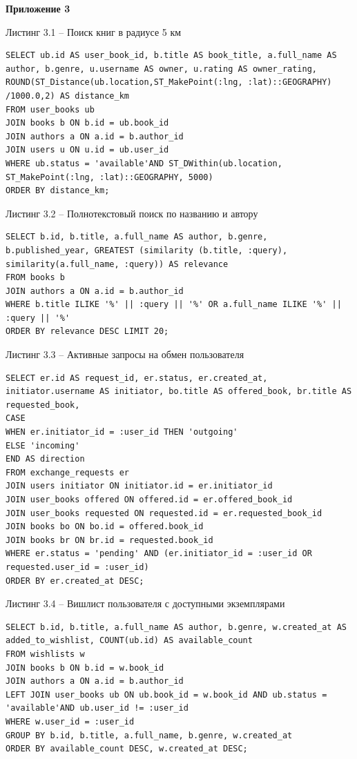 \documentclass[14pt,a4paper]{extarticle}
\begin{document}
\textbf{Приложение 3}

\begin{center}
Листинг 3.1 -- Поиск книг в радиусе 5 км
\end{center}
\begin{lstlisting}
SELECT ub.id AS user_book_id, b.title AS book_title, a.full_name AS author, b.genre, u.username AS owner, u.rating AS owner_rating, ROUND(ST_Distance(ub.location,ST_MakePoint(:lng, :lat)::GEOGRAPHY) /1000.0,2) AS distance_km
FROM user_books ub
JOIN books b ON b.id = ub.book_id
JOIN authors a ON a.id = b.author_id
JOIN users u ON u.id = ub.user_id
WHERE ub.status = 'available'AND ST_DWithin(ub.location, ST_MakePoint(:lng, :lat)::GEOGRAPHY, 5000)
ORDER BY distance_km;
\end{lstlisting}

\newpage
\begin{center}
Листинг 3.2 -- Полнотекстовый поиск по названию и автору
\end{center}
\begin{lstlisting}
SELECT b.id, b.title, a.full_name AS author, b.genre, b.published_year, GREATEST (similarity (b.title, :query), similarity(a.full_name, :query)) AS relevance
FROM books b
JOIN authors a ON a.id = b.author_id
WHERE b.title ILIKE '%' || :query || '%' OR a.full_name ILIKE '%' || :query || '%'
ORDER BY relevance DESC LIMIT 20;
\end{lstlisting}

\begin{center}
Листинг 3.3 -- Активные запросы на обмен пользователя
\end{center}
\begin{lstlisting}
SELECT er.id AS request_id, er.status, er.created_at, initiator.username AS initiator, bo.title AS offered_book, br.title AS requested_book, 
CASE
WHEN er.initiator_id = :user_id THEN 'outgoing'
ELSE 'incoming'
END AS direction
FROM exchange_requests er
JOIN users initiator ON initiator.id = er.initiator_id
JOIN user_books offered ON offered.id = er.offered_book_id
JOIN user_books requested ON requested.id = er.requested_book_id
JOIN books bo ON bo.id = offered.book_id
JOIN books br ON br.id = requested.book_id
WHERE er.status = 'pending' AND (er.initiator_id = :user_id OR requested.user_id = :user_id)
ORDER BY er.created_at DESC;
\end{lstlisting}

\begin{center}
Листинг 3.4 -- Вишлист пользователя с доступными экземплярами
\end{center}
\begin{lstlisting}
SELECT b.id, b.title, a.full_name AS author, b.genre, w.created_at AS added_to_wishlist, COUNT(ub.id) AS available_count
FROM wishlists w
JOIN books b ON b.id = w.book_id
JOIN authors a ON a.id = b.author_id
LEFT JOIN user_books ub ON ub.book_id = w.book_id AND ub.status = 'available'AND ub.user_id != :user_id
WHERE w.user_id = :user_id
GROUP BY b.id, b.title, a.full_name, b.genre, w.created_at
ORDER BY available_count DESC, w.created_at DESC;
\end{lstlisting}
\end{document}
